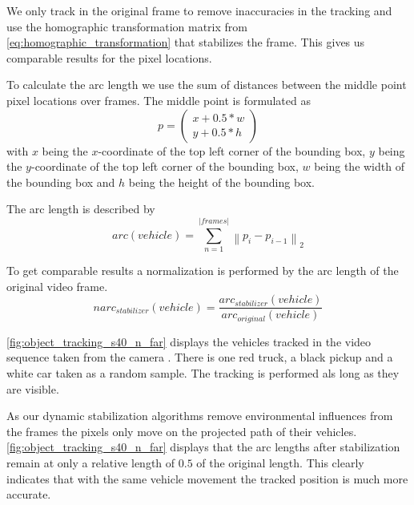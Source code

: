 We only track in the original frame to remove inaccuracies in the tracking and use the homographic transformation matrix from \autoref{eq:homographic_transformation} that stabilizes the frame.
This gives us comparable results for the pixel locations. 

To calculate the arc length we use the sum of distances between the middle point pixel locations over frames. 
The middle point is formulated as 
\begin{equation}
    p = \begin{pmatrix}
        x + 0.5 * w \\
        y + 0.5 * h
    \end{pmatrix}
\end{equation}
with $x$ being the $x$-coordinate of the top left corner of the bounding box, 
$y$ being the $y$-coordinate of the top left corner of the bounding box, 
$w$ being the width of the bounding box and
$h$ being the height of the bounding box.

The arc length is described by
\begin{equation}
    arc(vehicle) = \sum_{n = 1}^{\left\lvert frames \right\rvert } \left\lVert 
        p_{i} - p_{i-1}
    \right\rVert _2
\end{equation} 

To get comparable results a normalization is performed by the arc length of the original video frame.
\begin{equation}
    narc_{stabilizer}(vehicle) = 
    \frac{arc_{stabilizer}(vehicle)}{arc_{original}(vehicle)}
\end{equation} 

\autoref{fig:object_tracking_s40_n_far} displays the vehicles tracked in the video sequence taken from the camera . 
There is one red truck, a black pickup and a white car taken as a random sample.
The tracking is performed als long as they are visible.

As our dynamic stabilization algorithms remove environmental influences from the frames the pixels only move on the projected path of their vehicles.
\autoref{fig:object_tracking_s40_n_far} displays that the arc lengths after stabilization remain at only a relative length of $0.5$ of the original length.
This clearly indicates that with the same vehicle movement the tracked position is much more accurate.

